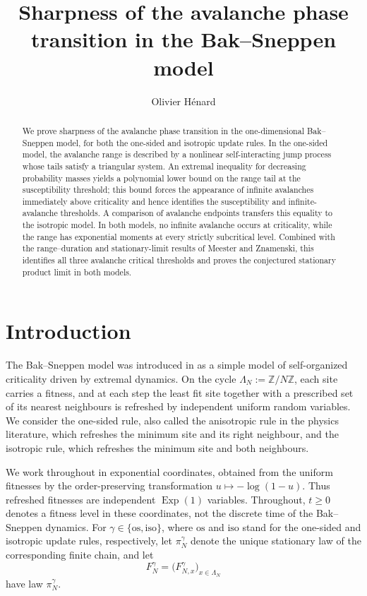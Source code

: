 \documentclass[11pt,a4paper]{amsart}
\title[Sharpness of Bak--Sneppen avalanches]
{Sharpness of the avalanche phase transition in the Bak--Sneppen model}
\author{Olivier Hénard}
\theoremstyle{remark}
\begin{document}
\begin{abstract}
We prove sharpness of the avalanche phase transition in the
one-dimensional Bak--Sneppen model, for both the one-sided and isotropic
update rules. In the one-sided model, the avalanche range is described by
a nonlinear self-interacting jump process whose tails satisfy a triangular
system. An extremal inequality for decreasing probability masses yields a
polynomial lower bound on the range tail at the susceptibility threshold;
this bound forces the appearance of infinite avalanches immediately above
criticality and hence identifies the susceptibility and infinite-avalanche
thresholds. A comparison of avalanche endpoints transfers this equality to
the isotropic model. In both models, no infinite avalanche occurs at
criticality, while the range has exponential moments at every strictly
subcritical level.  Combined with the range--duration and
stationary-limit results of Meester and Znamenski, this identifies all three
avalanche critical thresholds and proves the conjectured stationary product
limit in both models.
\end{abstract}


\maketitle

\section{Introduction}
\label{sec:introduction}

The Bak--Sneppen model was introduced in \cite{BS93} as a simple model of
self-organized criticality driven by extremal dynamics. On the cycle
$\Lambda_N:=\mathbb Z/N\mathbb Z$, each site carries a fitness, and at
each step the least fit site together with a prescribed set of its nearest
neighbours is refreshed by independent uniform random variables. 
We consider the one-sided rule, also called the anisotropic rule in the physics
literature, which refreshes the minimum site and its right neighbour, and the
isotropic rule, which refreshes the minimum site and both neighbours.


We work throughout in exponential coordinates, obtained from the uniform
fitnesses by the order-preserving transformation
$u\mapsto-\log(1-u)$. Thus refreshed fitnesses are independent
$\operatorname{Exp}(1)$ variables. Throughout, $t\geq0$ denotes a fitness
level in these coordinates, not the discrete time of the Bak--Sneppen
dynamics.
For $\gamma\in\{\mathrm{os},\mathrm{iso}\}$, where $\mathrm{os}$ and
$\mathrm{iso}$ stand for the one-sided and isotropic update rules,
respectively, let $\pi_N^\gamma$ denote the unique stationary law of the
corresponding finite chain, and let
\[
        F_N^\gamma
        =\bigl(F_{N,x}^\gamma\bigr)_{x\in\Lambda_N}
\]
have law $\pi_N^\gamma$.
\end{document}
